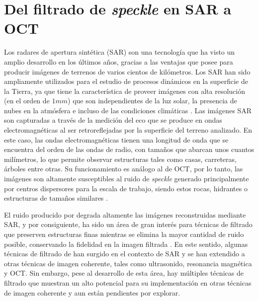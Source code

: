 \section{Del filtrado de \textit{speckle} en SAR a OCT}
\label{sec:from_SAR_to_OCT}

Los radares de apertura sintética (SAR) son una tecnología que ha visto un amplio desarrollo en los últimos años, gracias a las ventajas que posee para producir imágenes de terrenos de varios cientos de kilómetros. Los SAR han sido ampliamente utilizados para el estudio de procesos dinámicos en la superficie de la Tierra, ya que tiene la característica de proveer imágenes con alta resolución (en el orden de $1mm$) que son independientes de la luz solar, la presencia de nubes en la atmósfera e incluso de las condiciones climáticas \cite{Oliver2004,Moreira2013}. Las imágenes SAR son capturadas a través de la medición del eco que se produce en ondas electromagnéticas al ser retroreflejadas por la superficie del terreno analizado. En este caso, las ondas electromagnéticas tienen una longitud de onda que se encuentra del orden de las ondas de radio, con tamaños que abarcan unos cuantos milímetros, lo que permite observar estructuras tales como casas, carreteras, árboles entre otras. Su funcionamiento es análogo al de OCT, por lo tanto, las imágenes son altamente susceptibles al ruido de \textit{speckle} generado principalmente por centros dispersores para la escala de trabajo, siendo estos rocas, hidrantes o estructuras de tamaños similares \cite{Moreira2013}. 

El ruido producido por \speckle degrada altamente las imágenes reconstruidas mediante SAR, y por consiguiente, ha sido un área de gran interés para técnicas de filtrado que preserven estructuras finas mientras se elimina la mayor cantidad de ruido posible, conservando la fidelidad en la imagen filtrada \cite{Novak1990,Lopes2010}. En este sentido, algunas técnicas de filtrado de \speckle han surgido en el contexto de SAR y se han extendido a otras técnicas de imagen coherente, tales como ultrasonido, resonancia magnética y OCT. Sin embargo, pese al desarrollo de esta área, hay múltiples técnicas de filtrado que muestran un alto potencial para su implementación en otras técnicas de imagen coherente y aun están pendientes por explorar.

